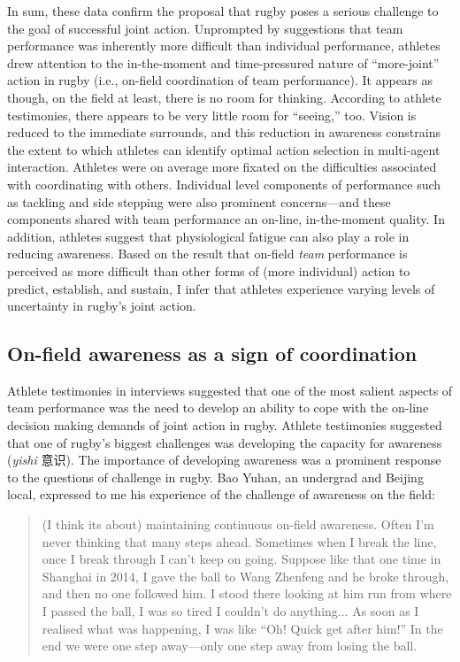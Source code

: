 \begin{CJK}{UTF8}{gbsn}
In sum, these data confirm the proposal that rugby poses a serious challenge to the goal of successful joint action.  Unprompted by suggestions that team performance was inherently more difficult than individual performance, athletes drew attention to the in-the-moment and time-pressured nature of ``more-joint'' action in rugby (i.e., on-field coordination of team performance).  It appears as though, on the field at least, there is no room for thinking.  According to athlete testimonies, there appears to be very little room for ``seeing,'' too.  Vision is reduced to the immediate surrounds, and this reduction in awareness constrains the extent to which athletes can identify optimal action selection in multi-agent interaction.  Athletes were on average more fixated on the difficulties associated with coordinating with others.  Individual level components of performance such as tackling and side stepping were also prominent concerns—and these components shared with team performance an on-line, in-the-moment quality.   In addition, athletes suggest that physiological fatigue can also play a role in reducing awareness.  Based on the result that on-field \textit{team} performance is perceived as more difficult than other forms of (more individual) action to predict, establish, and sustain, I infer that athletes experience varying levels of uncertainty in rugby's joint action.








\subsection{On-field awareness as a sign of coordination}
Athlete testimonies in interviews suggested that one of the most salient aspects of team performance was the need to develop an ability to cope with the on-line decision making demands of joint action in rugby.  Athlete testimonies suggested that one of rugby's biggest challenges was developing the capacity for awareness  (\textit{yishi} 意识).  The importance of developing awareness was a prominent response to the questions of challenge in rugby.  Bao Yuhan, an undergrad and Beijing local, expressed to me his experience of the challenge of awareness on the field:

    \begin{quote}
    (I think its about) maintaining continuous on-field awareness.  Often I'm never thinking that many steps ahead.  Sometimes when I break the line, once I break through I can't keep on going.  Suppose like that one time in Shanghai in 2014, I gave the ball to Wang Zhenfeng and he broke through, and then no one followed him.  I stood there looking at him run from where I passed the ball, I was so tired I couldn't do anything... As soon as I realised what was happening, I was like ``Oh! Quick get after him!'' In the end we were one step away---only one step away from losing the ball.
    \end{quote}


\end{CJK}
